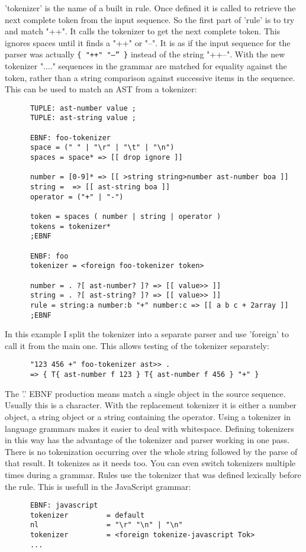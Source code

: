 \begin{itemize}
      'tokenizer' is the name of a built in rule. Once defined it is
      called to retrieve the next complete token from the input
      sequence. So the first part of 'rule' is to try and match
      "++". It calls the tokenizer to get the next complete
      token. This ignores spaces until it finds a "++" or "--". It is
      as if the input sequence for the parser was actually 
      \texttt{\{ "++" "--'' \}} instead of the string "++--". With the new tokenizer "...."
      sequences in the grammar are matched for equality against the
      token, rather than a string comparison against successive items
      in the sequence. This can be used to match an AST from a
      tokenizer:
\begin{verbatim}
      TUPLE: ast-number value ;
      TUPLE: ast-string value ;

      EBNF: foo-tokenizer
      space = (" " | "\r" | "\t" | "\n")
      spaces = space* => [[ drop ignore ]]

      number = [0-9]* => [[ >string string>number ast-number boa ]]
      string =  => [[ ast-string boa ]]
      operator = ("+" | "-")

      token = spaces ( number | string | operator )
      tokens = tokenizer*
      ;EBNF

      ENBF: foo
      tokenizer = <foreign foo-tokenizer token>

      number = . ?[ ast-number? ]? => [[ value>> ]]
      string = . ?[ ast-string? ]? => [[ value>> ]]
      rule = string:a number:b "+" number:c => [[ a b c + 2array ]]
      ;EBNF
\end{verbatim}

      In this example I split the tokenizer into a separate parser and
 use 'foreign' to call it from the main one. This allows testing of
 the tokenizer separately:
\begin{verbatim}
      "123 456 +" foo-tokenizer ast>> .
      => { T{ ast-number f 123 } T{ ast-number f 456 } "+" }
\end{verbatim}

      The '.' EBNF production means match a single object in the
      source sequence. Usually this is a character. With the
      replacement tokenizer it is either a number object, a string
      object or a string containing the operator. Using a tokenizer in
      language grammars makes it easier to deal with
      whitespace. Defining tokenizers in this way has the advantage of
      the tokenizer and parser working in one pass. There is no
      tokenization occurring over the whole string followed by the
      parse of that result. It tokenizes as it needs too. You can even
      switch tokenizers multiple times during a grammar. Rules use the
      tokenizer that was defined lexically before the rule. This is
      usefull in the JavaScript grammar:
\begin{verbatim}
      EBNF: javascript
      tokenizer         = default 
      nl                = "\r" "\n" | "\n"
      tokenizer         = <foreign tokenize-javascript Tok>
      ...


\end{verbatim}
\end{itemize}
